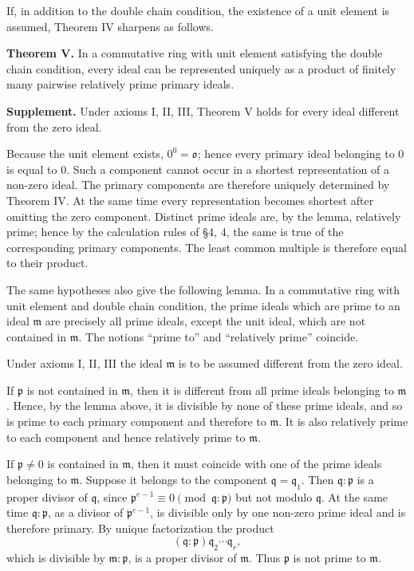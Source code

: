 \documentclass[
  12pt,
]{article}
\begin{document}
If, in addition to the double chain condition, the existence of a unit
element is assumed, Theorem IV sharpens as follows.

\textbf{Theorem V.} In a commutative ring with unit element satisfying
the double chain condition, every ideal can be represented uniquely as a
product of finitely many pairwise relatively prime primary ideals.

\textbf{Supplement.} Under axioms I, II, III, Theorem V holds for every
ideal different from the zero ideal.

Because the unit element exists, \(0^0=\mathfrak o\); hence every
primary ideal belonging to \(0\) is equal to \(0\). Such a component
cannot occur in a shortest representation of a non-zero ideal. The
primary components are therefore uniquely determined by Theorem IV. At
the same time every representation becomes shortest after omitting the
zero component. Distinct prime ideals are, by the lemma, relatively
prime; hence by the calculation rules of §4, 4, the same is true of the
corresponding primary components. The least common multiple is therefore
equal to their product.

The same hypotheses also give the following lemma. In a commutative ring
with unit element and double chain condition, the prime ideals which are
prime to an ideal \(\mathfrak m\) are precisely all prime ideals, except
the unit ideal, which are not contained in \(\mathfrak m\). The notions
``prime to'' and ``relatively prime'' coincide.

Under axioms I, II, III the ideal \(\mathfrak m\) is to be assumed
different from the zero ideal.

If \(\mathfrak p\) is not contained in \(\mathfrak m\), then it is
different from all prime ideals belonging to \(\mathfrak m\). Hence, by
the lemma above, it is divisible by none of these prime ideals, and so
is prime to each primary component and therefore to \(\mathfrak m\). It
is also relatively prime to each component and hence relatively prime to
\(\mathfrak m\).

If \(\mathfrak p\ne0\) is contained in \(\mathfrak m\), then it must
coincide with one of the prime ideals belonging to \(\mathfrak m\).
Suppose it belongs to the component \(\mathfrak q=\mathfrak q_1\). Then
\(\mathfrak q:\mathfrak p\) is a proper divisor of \(\mathfrak q\),
since \(\mathfrak p^{e-1}\equiv0\pmod{\mathfrak q:\mathfrak p}\) but not
modulo \(\mathfrak q\). At the same time \(\mathfrak q:\mathfrak p\), as
a divisor of \(\mathfrak p^{e-1}\), is divisible only by one non-zero
prime ideal and is therefore primary. By unique factorization the
product \[
  (\mathfrak q:\mathfrak p)\mathfrak q_2\cdots\mathfrak q_r,
\] which is divisible by \(\mathfrak m:\mathfrak p\), is a proper
divisor of \(\mathfrak m\). Thus \(\mathfrak p\) is not prime to
\(\mathfrak m\).
\end{document}
